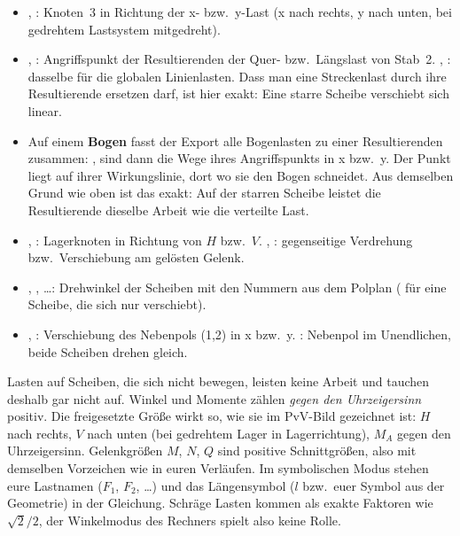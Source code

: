 \begin{itemize}
  \item {}, : Knoten~3 in Richtung der x- bzw.\ y-Last (x nach rechts, y nach
        unten, bei gedrehtem Lastsystem mitgedreht).
  \item {}, : Angriffspunkt der Resultierenden der Quer- bzw.\ Längslast von
        Stab~2. , : dasselbe für die globalen Linienlasten. Dass man eine
        Streckenlast durch ihre Resultierende ersetzen darf, ist hier exakt: Eine starre Scheibe
        verschiebt sich linear.
  \item Auf einem \textbf{Bogen} fasst der Export alle Bogenlasten zu einer Resultierenden
        zusammen: ,  sind dann die Wege ihres
        Angriffspunkts in x bzw.\ y. Der Punkt liegt auf ihrer Wirkungslinie, dort wo sie den Bogen
        schneidet. Aus demselben Grund wie oben ist das exakt: Auf der starren Scheibe leistet die
        Resultierende dieselbe Arbeit wie die verteilte Last.
  \item {}, : Lagerknoten in Richtung von $H$ bzw.\ $V$. , :
        gegenseitige Verdrehung bzw.\ Verschiebung am gelösten Gelenk.
  \item {}, , \dots: Drehwinkel der Scheiben mit den Nummern aus dem Polplan
        ( für eine Scheibe, die sich nur verschiebt).
  \item {}, : Verschiebung des Nebenpols (1,2) in x bzw.\ y.
        : Nebenpol im Unendlichen, beide Scheiben drehen gleich.
\end{itemize}

Lasten auf Scheiben, die sich nicht bewegen, leisten keine Arbeit und tauchen deshalb gar nicht
auf. Winkel und Momente zählen \emph{gegen den Uhrzeigersinn} positiv. Die
freigesetzte Größe wirkt so, wie sie im PvV-Bild gezeichnet ist: $H$ nach rechts, $V$ nach unten
(bei gedrehtem Lager in Lagerrichtung), $M_A$ gegen den Uhrzeigersinn. Gelenkgrößen $M$, $N$, $Q$
sind positive Schnittgrößen, also mit demselben Vorzeichen wie in euren Verläufen. Im symbolischen
Modus stehen eure Lastnamen ($F_1$, $F_2$, \dots) und das Längensymbol ($l$ bzw.\ euer Symbol aus
der Geometrie) in der Gleichung. Schräge Lasten kommen als exakte Faktoren wie $\sqrt{2}/2$, der
Winkelmodus des Rechners spielt also keine Rolle.


